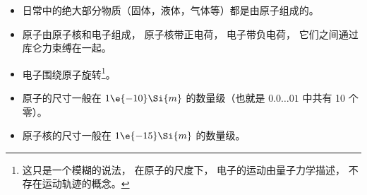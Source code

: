 
\begin{issues}
\issueDraft
\end{issues}

\begin{itemize}
\item 日常中的绝大部分物质（固体，液体，气体等）都是由原子组成的。
\item 原子由原子核和电子组成， 原子核带正电荷， 电子带负电荷， 它们之间通过库仑力束缚在一起。
\item 电子围绕原子旋转\footnote{这只是一个模糊的说法， 在原子的尺度下， 电子的运动由量子力学描述， 不存在运动轨迹的概念。}。
\item 原子的尺寸一般在 $1\e{-10}\Si{m}$ 的数量级（也就是 $0.0\dots01$ 中共有 10 个零）。
\item 原子核的尺寸一般在 $1\e{-15}\Si{m}$ 的数量级。
\end{itemize}
